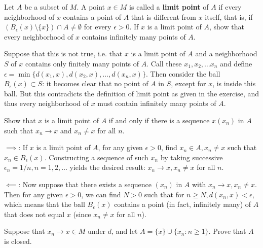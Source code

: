 \begin{exercise}{33}
    Let $A$ be a subset of $M$.
    A point $x \in M$ is called a \textbf{limit point} of $A$ if every neighborhood of $x$ contains a point of $A$ that is different from $x$ itself, that is, if $(B_{\epsilon}(x) \setminus \{x\}) \cap A \neq \emptyset$ for every $\epsilon > 0$.
    If $x$ is a limit point of $A$, show that every neighborhood of $x$ contains infinitely many points of $A$.
\end{exercise}

\begin{solution}
    
    Suppose that this is not true, i.e. that $x$ is a limit point of $A$ and a neighborhood $S$ of $x$ contains only finitely many points of $A$.
    Call these $x_1, x_2, \ldots x_n$ and define $\epsilon = \min\{d(x_1, x), d(x_2, x), \ldots, d(x_n, x)\}$.
    Then consider the ball $B_{\epsilon}(x) \subset S$: it becomes clear that no point of $A$ in $S$, except for $x$, is inside this ball.
    But this contradicts the definition of limit point as given in the exercise, and thus every neighborhood of $x$ must contain infinitely many points of $A$.
\end{solution}

\begin{exercise}{34}
    Show that $x$ is a limit point of $A$ if and only if there is a sequence $x(x_n)$ in $A$ such that $x_n \rightarrow x$ and $x_n \neq x$ for all $n$.
\end{exercise}

\begin{solution}
    
    $\implies$: If $x$ is a limit point of $A$, for any given $\epsilon > 0$, find $x_n \in A, x_n \neq x$ such that $x_n \in B_{\epsilon}(x)$.
    Constructing a sequence of such $x_n$ by taking successive $\epsilon_n = 1/n, n = 1, 2, \ldots$ yields the desired result: $x_n \rightarrow x, x_n \neq x$ for all $n$.

    $\impliedby$: Now suppose that there exists a sequence $(x_n)$ in $A$ with $x_n \rightarrow x, x_n \neq x$. 
    Then for any given $\epsilon > 0$, we can find $N > 0$ such that for $n \geq N, d(x_n, x) < \epsilon$, which means that the ball $B_{\epsilon}(x)$ contains a point (in fact, infinitely many) of $A$ that does not equal $x$ (since $x_n \neq x$ for all $n$).
\end{solution}

\begin{exercise}{36}
    Suppose that $x_n \rightarrow x \in M$ under $d$, and let $A = \{x\} \cup \{x_n : n \geq 1\}$.
    Prove that $A$ is closed.
\end{exercise}

